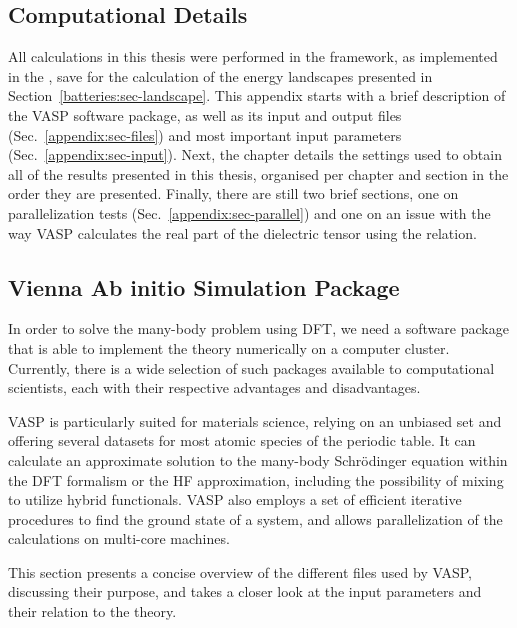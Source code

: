 \begin{refsection} 

\chapter{Computational Details} \label{appendix:sec-computational} 
 
All calculations in this thesis were performed in the  framework, 
as implemented in the , save for the calculation of the energy 
landscapes presented in Section~\ref{batteries:sec-landscape}. This appendix starts with 
a brief description of the VASP software package, as well as its input and 
output files (Sec.~\ref{appendix:sec-files}) and most important input 
parameters (Sec.~\ref{appendix:sec-input}). Next, the chapter details the 
settings used to obtain all of the results presented in this thesis, organised 
per chapter and section in the order they are presented. Finally, there are 
still two brief sections, one on parallelization tests 
(Sec.~\ref{appendix:sec-parallel}) and one on an issue with the way 
VASP calculates the real part of the dielectric tensor using 
the  relation.

\section{Vienna Ab initio Simulation Package} \label{appendix:sec-VASP} 
 
In order to solve the many-body problem using DFT, we need a software package 
that is able to implement the theory numerically on a computer cluster. 
Currently, there is a wide selection of such packages available to 
computational scientists, each with their respective advantages and 
disadvantages. 
 
VASP is particularly suited for materials science, relying on an unbiased
 set and offering several  datasets for 
most atomic species of the periodic table. It can calculate an approximate 
solution to the many-body Schr\"odinger equation within the DFT formalism or 
the HF approximation, including the possibility of mixing to utilize hybrid 
functionals. VASP also employs a set of efficient iterative procedures to find 
the ground state of a system, and allows parallelization of the calculations 
on multi-core machines. 
 
This section presents a concise overview of the different files used by 
VASP, discussing their purpose, and takes a closer look at the 
input parameters and their relation to the theory. 
 

\end{refsection}
